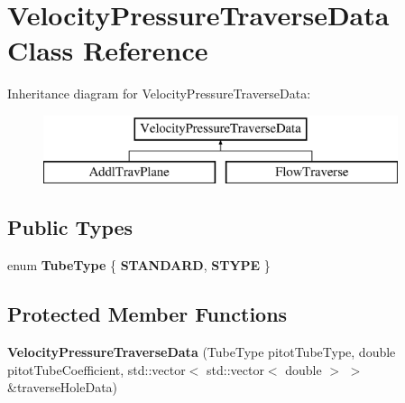 \hypertarget{class_velocity_pressure_traverse_data}{}\section{Velocity\+Pressure\+Traverse\+Data Class Reference}
\label{class_velocity_pressure_traverse_data}
Inheritance diagram for Velocity\+Pressure\+Traverse\+Data\+:\begin{figure}[H]
\begin{center}
\leavevmode
\includegraphics[height=2.000000cm]{d8/d09/class_velocity_pressure_traverse_data}
\end{center}
\end{figure}
\subsection*{Public Types}
\begin{DoxyCompactItemize}
\item 
\mbox{\label{class_velocity_pressure_traverse_data_a49d8ff6fe010e2160c285822bb6cf2ae}} 
enum {\bfseries Tube\+Type} \{ {\bfseries S\+T\+A\+N\+D\+A\+RD}, 
{\bfseries S\+T\+Y\+PE}
 \}
\end{DoxyCompactItemize}
\subsection*{Protected Member Functions}
\begin{DoxyCompactItemize}
\item 
\mbox{\label{class_velocity_pressure_traverse_data_a9004d68c508c30b2af6de8bd846d1b84}} 
{\bfseries Velocity\+Pressure\+Traverse\+Data} (Tube\+Type pitot\+Tube\+Type, double pitot\+Tube\+Coefficient, std\+::vector$<$ std\+::vector$<$ double $>$ $>$ \&traverse\+Hole\+Data)
\end{DoxyCompactItemize}
